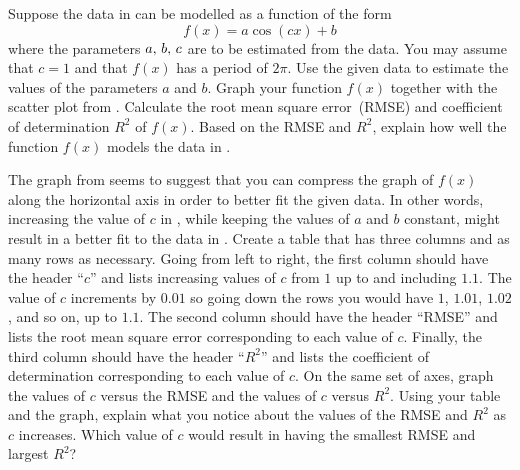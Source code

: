 \documentclass[a4paper,oneside,12pt]{article}
\begin{document}
\begin{problem}
\begin{packedenum}
  \item\label{subprob:trigonometric:mean_daily_sunshine_model}
    Suppose the data in 
    can be modelled as a function of the form
    \begin{equation}
    \label{eqn:trigonometric:mean_daily_sunshine_c1}
    f(x)
    =
    a \cos(cx) + b
    \end{equation}
    where the parameters ${a},\, {b},\, {c}$ are to be estimated from
    the data.  You may assume that $c = 1$ and that $f(x)$ has a
    period of $2\pi$.  Use the given data to estimate the values of
    the parameters $a$ and $b$.  Graph your function $f(x)$ together
    with the scatter plot
    from .
    Calculate the root mean square error~(RMSE) and coefficient of
    determination $R^2$ of $f(x)$.  Based on the RMSE and $R^2$,
    explain how well the function $f(x)$ models the data in
    .

  \item\label{subprob:trigonometric:mean_daily_sunshine_compress}
    The graph
    from  seems
    to suggest that you can compress the graph of $f(x)$ along the
    horizontal axis in order to better fit the given data.  In other
    words, increasing the value of $c$ in
    , while keeping
    the values of $a$ and $b$ constant, might result in a better fit
    to the data in .
    Create a table that has three columns and as many rows as
    necessary.  Going from left to right, the first column should have
    the header ``$c$'' and lists increasing values of $c$ from $1$ up
    to and including $1.1$.  The value of $c$ increments by $0.01$ so
    going down the rows you would have $1$, $1.01$, $1.02$, and so on,
    up to $1.1$.  The second column should have the header ``RMSE''
    and lists the root mean square error corresponding to each value
    of $c$.  Finally, the third column should have the header
    ``$R^2$'' and lists the coefficient of determination corresponding
    to each value of $c$.  On the same set of axes, graph the values
    of $c$ versus the RMSE and the values of $c$ versus $R^2$.  Using
    your table and the graph, explain what you notice about the values
    of the RMSE and $R^2$ as $c$ increases.  Which value of $c$ would
    result in 
    having the smallest RMSE and largest $R^2$?


\end{packedenum}
\end{problem}
\end{document}

